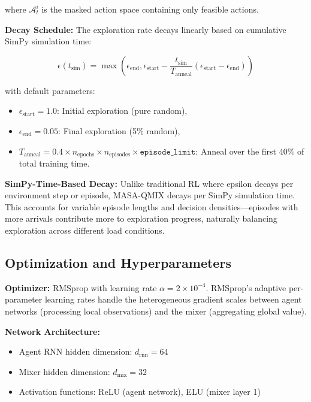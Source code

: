 where \(\mathcal{A}_t^i\) is the masked action space containing only feasible actions.

\textbf{Decay Schedule:} The exploration rate decays linearly based on cumulative SimPy simulation time:

\begin{equation}
\epsilon(t_{\text{sim}}) = \max\left( \epsilon_{\text{end}}, \epsilon_{\text{start}} - \frac{t_{\text{sim}}}{T_{\text{anneal}}} (\epsilon_{\text{start}} - \epsilon_{\text{end}}) \right)
\end{equation}

with default parameters:
\begin{itemize}
\item \(\epsilon_{\text{start}} = 1.0\): Initial exploration (pure random),
\item \(\epsilon_{\text{end}} = 0.05\): Final exploration (5\% random),
\item \(T_{\text{anneal}} = 0.4 \times n_{\text{epochs}} \times n_{\text{episodes}} \times \texttt{episode\_limit}\): Anneal over the first 40\% of total training time.
\end{itemize}

\textbf{SimPy-Time-Based Decay:} Unlike traditional RL where epsilon decays per environment step or episode, MASA-QMIX decays per SimPy simulation time. This accounts for variable episode lengths and decision densities—episodes with more arrivals contribute more to exploration progress, naturally balancing exploration across different load conditions.

\subsection{Optimization and Hyperparameters}
\label{sec:hyperparameters}

\textbf{Optimizer:} RMSprop with learning rate \(\alpha = 2 \times 10^{-4}\). RMSprop's adaptive per-parameter learning rates handle the heterogeneous gradient scales between agent networks (processing local observations) and the mixer (aggregating global value).

\textbf{Network Architecture:}
\begin{itemize}
\item Agent RNN hidden dimension: \(d_{\text{rnn}} = 64\)
\item Mixer hidden dimension: \(d_{\text{mix}} = 32\)
\item Activation functions: ReLU (agent network), ELU (mixer layer 1)
\end{itemize}

